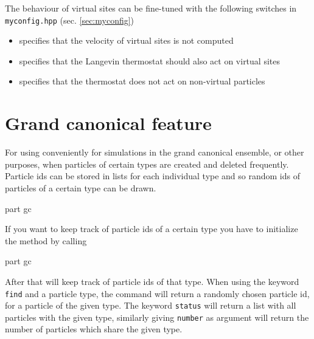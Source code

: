 The behaviour of virtual sites can be fine-tuned with the following
switches in \texttt{myconfig.hpp} (sec. \ref{sec:myconfig})
\begin{itemize}
\item {} specifies that the velocity
  of virtual sites is not computed
\item {} specifies that the Langevin
  thermostat should also act on virtual sites
\item {} specifies that the
  thermostat does not act on non-virtual particles
\end{itemize}

\section{Grand canonical feature}
For using \es conveniently for simulations in the grand canonical ensemble, or
other purposes, when particles of certain types are created and deleted frequently.
Particle ids can be stored in lists for each individual type and so random ids of
particles of a certain type can be drawn. 

\begin{essyntax}
part gc
\end{essyntax}

If you want \es to keep track of particle ids of a certain type you have to
initialize the method by calling 
\begin{essyntax}
	part gc 
\end{essyntax}
After that \es will keep track of particle ids of that type. 
When using the keyword \texttt{find} and a particle type, the
command will return a randomly chosen particle id, for a particle of
the given type. 
The keyword \texttt{status} will return a list with all particles with the given
type, similarly giving \texttt{number} as argument will return the number of
particles which share the given type.

